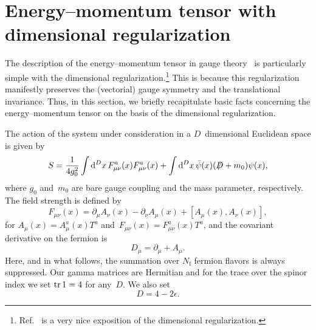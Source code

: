 \section{Energy--momentum tensor with dimensional regularization}
\label{sec:2}
The description of the energy--momentum tensor in gauge
theory~\cite{Freedman:1974gs,Joglekar:1975jm} is particularly simple with the
dimensional regularization.\footnote{Ref.~\cite{Collins:1984xc} is a very nice
exposition of the dimensional regularization.} This is because this
regularization manifestly preserves the (vectorial) gauge symmetry and the
translational invariance. Thus, in this section, we briefly recapitulate basic
facts concerning the energy--momentum tensor on the basis of the dimensional
regularization.

The action of the system under consideration in a $D$~dimensional Euclidean
space is given by
\begin{equation}
   S=\frac{1}{4g_0^2}\int\mathrm{d}^Dx\,F_{\mu\nu}^a(x)F_{\mu\nu}^a(x)
   +\int\mathrm{d}^Dx\,\Bar{\psi}(x)(\Slash{D}+m_0)\psi(x),
\label{eq:(2.1)}
\end{equation}
where $g_0$ and~$m_0$ are bare gauge coupling and the mass parameter,
respectively. The field strength is defined by
\begin{equation}
   F_{\mu\nu}(x)
   =\partial_\mu A_\nu(x)-\partial_\nu A_\mu(x)+[A_\mu(x),A_\nu(x)],
\label{eq:(2.2)}
\end{equation}
for $A_\mu(x)=A_\mu^a(x)T^a$ and~$F_{\mu\nu}(x)=F_{\mu\nu}^a(x)T^a$, and the
covariant derivative on the fermion is
\begin{equation}
   D_\mu=\partial_\mu+A_\mu.
\label{eq:(2.3)}
\end{equation}
Here, and in what follows, the summation over $N_{\mathrm{f}}$ fermion flavors is always
suppressed. Our gamma matrices are Hermitian and for the trace over the spinor
index we set $\operatorname{tr} 1=4$ for any~$D$. We also set
\begin{equation}
   D=4-2\epsilon.
\label{eq:(2.4)}
\end{equation}


